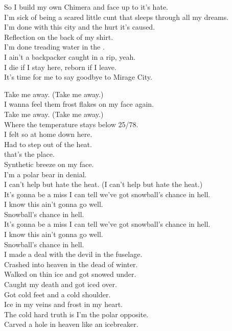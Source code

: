 So I build my own Chimera and face up to it's hate. \\
I'm sick of being a scared little cunt that sleeps through all my dreams. \\
I'm done with this city and the hurt it's caused. \\
Reflection on the back of my shirt. \\
I'm done treading water in the . \\
I ain't a backpacker caught in a rip, yeah. \\
I die if I stay here, reborn if I leave. \\
It's time for me to say goodbye to Mirage City. \\



Take me away. (Take me away.) \\
I wanna feel them frost flakes on my face again. \\
Take me away. (Take me away.) \\
Where the temperature stays below 25/78. \\

I felt so at home down here. \\
Had to step out of the heat. \\
 that's the place. \\
Synthetic breeze on my face. \\
I'm a polar bear in denial. \\
I can't help but hate the heat. (I can't help but hate the heat.) \\

It's gonna be a miss I can tell we've got snowball's chance in hell. \\
I know this ain't gonna go well. \\
Snowball's chance in hell. \\
It's gonna be a miss I can tell we've got snowball's chance in hell. \\
I know this ain't gonna go well. \\
Snowball's chance in hell. \\

I made a deal with the devil in the fuselage. \\
Crashed into heaven in the dead of winter. \\
Walked on thin ice and got snowed under. \\
Caught my death and got iced over. \\
Got cold feet and a cold shoulder. \\
Ice in my veins and frost in my heart. \\
The cold hard truth is I'm the polar opposite. \\
Carved a hole in heaven like an icebreaker. \\

